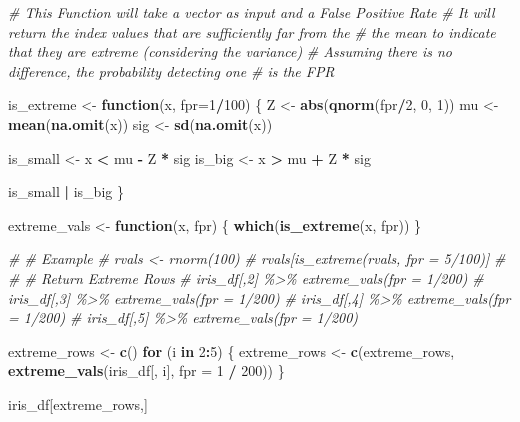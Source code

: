 \documentclass[
]{article}
\newenvironment{Shaded}{\begin{snugshade}}{\end{snugshade}}
\newcommand{\CommentTok}[1]{\textcolor[rgb]{0.56,0.35,0.01}{\textit{#1}}}
\newcommand{\ControlFlowTok}[1]{\textcolor[rgb]{0.13,0.29,0.53}{\textbf{#1}}}
\newcommand{\DataTypeTok}[1]{\textcolor[rgb]{0.13,0.29,0.53}{#1}}
\newcommand{\DecValTok}[1]{\textcolor[rgb]{0.00,0.00,0.81}{#1}}
\newcommand{\KeywordTok}[1]{\textcolor[rgb]{0.13,0.29,0.53}{\textbf{#1}}}
\newcommand{\NormalTok}[1]{#1}
\newcommand{\OperatorTok}[1]{\textcolor[rgb]{0.81,0.36,0.00}{\textbf{#1}}}
\newcommand{\StringTok}[1]{\textcolor[rgb]{0.31,0.60,0.02}{#1}}
\begin{document}
\begin{Shaded}
\begin{Highlighting}[]
\CommentTok{\# This Function will take a vector as input and a False Positive Rate}
    \CommentTok{\# It will return the index values that are sufficiently far from the }
    \CommentTok{\# the mean to indicate that they are extreme (considering the variance)}
        \CommentTok{\# Assuming there is no difference, the probability detecting one}
        \CommentTok{\# is the FPR}

\NormalTok{is\_extreme <{-}}\StringTok{ }\ControlFlowTok{function}\NormalTok{(x, }\DataTypeTok{fpr=}\DecValTok{1}\OperatorTok{/}\DecValTok{100}\NormalTok{) \{}
\NormalTok{ Z   <{-}}\StringTok{ }\KeywordTok{abs}\NormalTok{(}\KeywordTok{qnorm}\NormalTok{(fpr}\OperatorTok{/}\DecValTok{2}\NormalTok{, }\DecValTok{0}\NormalTok{, }\DecValTok{1}\NormalTok{)) }
\NormalTok{ mu  <{-}}\StringTok{ }\KeywordTok{mean}\NormalTok{(}\KeywordTok{na.omit}\NormalTok{(x))}
\NormalTok{ sig <{-}}\StringTok{ }\KeywordTok{sd}\NormalTok{(}\KeywordTok{na.omit}\NormalTok{(x)) }
  
\NormalTok{  is\_small <{-}}\StringTok{ }\NormalTok{x }\OperatorTok{<}\StringTok{ }\NormalTok{mu }\OperatorTok{{-}}\StringTok{ }\NormalTok{Z }\OperatorTok{*}\StringTok{ }\NormalTok{sig}
\NormalTok{  is\_big   <{-}}\StringTok{ }\NormalTok{x }\OperatorTok{>}\StringTok{ }\NormalTok{mu }\OperatorTok{+}\StringTok{ }\NormalTok{Z }\OperatorTok{*}\StringTok{ }\NormalTok{sig}
  
\NormalTok{  is\_small }\OperatorTok{|}\StringTok{ }\NormalTok{is\_big}
\NormalTok{\}}

\NormalTok{extreme\_vals <{-}}\StringTok{ }\ControlFlowTok{function}\NormalTok{(x, fpr) \{}
 \KeywordTok{which}\NormalTok{(}\KeywordTok{is\_extreme}\NormalTok{(x, fpr)) }
\NormalTok{\}}

\CommentTok{\#   \# Example}
\CommentTok{\# rvals <{-} rnorm(100)}
\CommentTok{\# rvals[is\_extreme(rvals, fpr = 5/100)]}
\CommentTok{\# }
\CommentTok{\# \# Return Extreme Rows}
\CommentTok{\# iris\_df[,2] \%>\% extreme\_vals(fpr = 1/200)}
\CommentTok{\# iris\_df[,3] \%>\% extreme\_vals(fpr = 1/200)}
\CommentTok{\# iris\_df[,4] \%>\% extreme\_vals(fpr = 1/200)}
\CommentTok{\# iris\_df[,5] \%>\% extreme\_vals(fpr = 1/200)}

\NormalTok{extreme\_rows <{-}}\StringTok{ }\KeywordTok{c}\NormalTok{()}
\ControlFlowTok{for}\NormalTok{ (i }\ControlFlowTok{in} \DecValTok{2}\OperatorTok{:}\DecValTok{5}\NormalTok{) \{}
\NormalTok{  extreme\_rows <{-}}
\StringTok{    }\KeywordTok{c}\NormalTok{(extreme\_rows, }\KeywordTok{extreme\_vals}\NormalTok{(iris\_df[, i], }\DataTypeTok{fpr =} \DecValTok{1} \OperatorTok{/}\StringTok{ }\DecValTok{200}\NormalTok{))}
\NormalTok{\}}

\NormalTok{iris\_df[extreme\_rows,]}
\end{Highlighting}
\end{Shaded}
\end{document}
